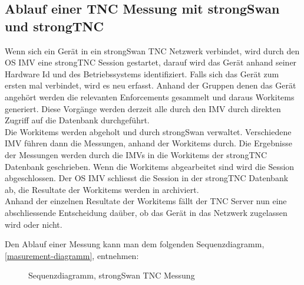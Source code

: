 \subsection{Ablauf einer TNC Messung mit strongSwan und strongTNC}
Wenn sich ein Gerät in ein strongSwan TNC Netzwerk verbindet, wird durch den OS
IMV eine strongTNC Session gestartet, darauf wird das Gerät anhand seiner
Hardware Id und des Betriebssystems identifiziert. Falls sich das Gerät zum
ersten mal verbindet, wird es neu erfasst. Anhand der Gruppen denen das Gerät
angehört werden die relevanten Enforcements gesammelt und daraus Workitems
generiert. Diese Vorgänge werden derzeit alle durch den IMV durch direkten
Zugriff auf die Datenbank durchgeführt.\\
Die Workitems werden abgeholt und durch strongSwan verwaltet.
Verschiedene IMV führen dann die Messungen, anhand der Workitems durch. Die
Ergebnisse der Messungen werden durch die IMVs in die Workitems der strongTNC
Datenbank geschrieben. Wenn die Workitems abgearbeitet sind wird die Session
abgeschlossen. Der OS IMV schliesst die Session in der strongTNC Datenbank ab,
die Resultate der Workitems werden in archiviert.\\
Anhand der einzelnen Resultate der Workitems fällt der TNC Server nun eine
abschliessende Entscheidung daüber, ob das Gerät in das Netzwerk zugelassen wird
oder nicht.

Den Ablauf einer Messung kann man dem folgenden Sequenzdiagramm,
\autoref{masurement-diagramm}, entnehmen:
\begin{figure}[H]	
	\centering
	
	\caption{Sequenzdiagramm, strongSwan TNC Messung}
	\label{masurement-diagramm}
\end{figure}

